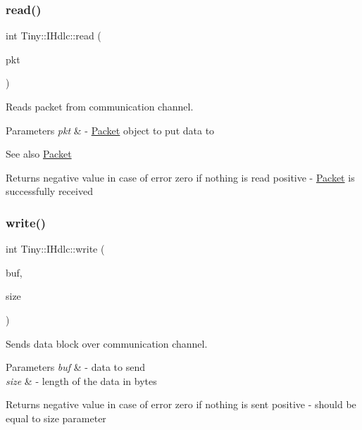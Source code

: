 \subsubsection{\texorpdfstring{read()}{read()}\hspace{0.1cm}{\footnotesize\ttfamily [2/2]}}
{\footnotesize\ttfamily int Tiny\+::\+I\+Hdlc\+::read (\begin{DoxyParamCaption}\item[{\hyperlink{classTiny_1_1IPacket}{I\+Packet} \&}]{pkt }\end{DoxyParamCaption})}

Reads packet from communication channel. 
\begin{DoxyParams}{Parameters}
{\em pkt} & -\/ \hyperlink{classTiny_1_1Packet}{Packet} object to put data to \\
\hline
\end{DoxyParams}
\begin{DoxySeeAlso}{See also}
\hyperlink{classTiny_1_1Packet}{Packet} 
\end{DoxySeeAlso}
\begin{DoxyReturn}{Returns}
negative value in case of error zero if nothing is read positive -\/ \hyperlink{classTiny_1_1Packet}{Packet} is successfully received 
\end{DoxyReturn}
\mbox{\label{classTiny_1_1IHdlc_ab02dd87b4465ffb73fd409dffbe394d2}} 
\subsubsection{\texorpdfstring{write()}{write()}\hspace{0.1cm}{\footnotesize\ttfamily [1/2]}}
{\footnotesize\ttfamily int Tiny\+::\+I\+Hdlc\+::write (\begin{DoxyParamCaption}\item[{const char $\ast$}]{buf,  }\item[{int}]{size }\end{DoxyParamCaption})}

Sends data block over communication channel. 
\begin{DoxyParams}{Parameters}
{\em buf} & -\/ data to send \\
\hline
{\em size} & -\/ length of the data in bytes \\
\hline
\end{DoxyParams}
\begin{DoxyReturn}{Returns}
negative value in case of error zero if nothing is sent positive -\/ should be equal to size parameter 
\end{DoxyReturn}
\mbox{\label{classTiny_1_1IHdlc_aca84fd7cf4d6b88e31064fc8bc43ddcb}} 

